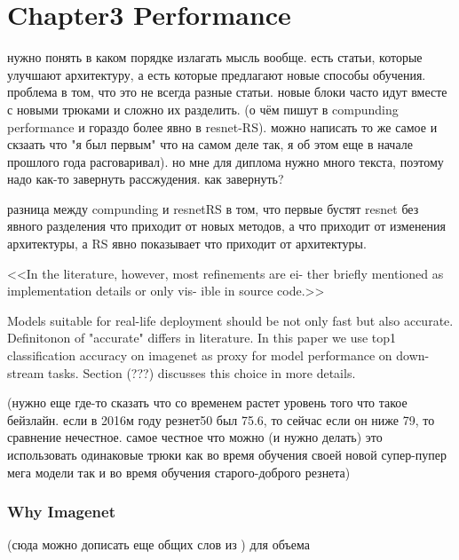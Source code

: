 
\chapter{Chapter3 Performance}

нужно понять в каком порядке излагать мысль вообще. есть статьи, которые улучшают архитектуру, а есть которые предлагают новые способы обучения. проблема в том, что это не всегда разные статьи. новые блоки часто идут вместе с новыми трюками и сложно их разделить. (о чём пишут в compunding performance и гораздо более явно в resnet-RS). можно написать то же самое и скзаать что "я был первым" что на самом деле так, я об этом еще в начале прошлого года расговаривал). но мне для диплома нужно много текста, поэтому надо как-то завернуть рассжудения. как завернуть? 

разница между compunding и resnetRS в том, что первые бустят resnet без явного разделения что приходит от новых методов, а что приходит от изменения архитектуры, а RS явно показывает что приходит от архитектуры. 

<<In the literature, however, most refinements are ei- ther briefly mentioned as implementation details or only vis- ible in source code.>>

Models suitable for real-life deployment should be not only fast but also accurate. Definitonon of "accurate" differs in literature. In this paper we use top1 classification accuracy on imagenet as proxy for model performance on down-stream tasks. Section (???) discusses this choice in more details.



(нужно еще где-то сказать что со временем растет уровень того что такое бейзлайн. если в 2016м году резнет50 был 75.6, то сейчас если он ниже 79, то сравнение нечестное. самое честное что можно (и нужно делать) это использовать одинаковые трюки как во время обучения своей новой супер-пупер мега модели так и во время обучения старого-доброго резнета)

\subsection{Why Imagenet}

(сюда можно дописать еще общих слов из \cite{beyer2020_are_we_done}) для объема

